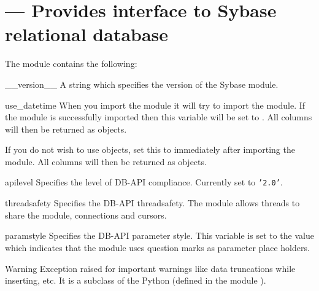 \section{ --- Provides interface to Sybase relational database}



The  module contains the following:

\begin{datadesc}{__version__}
A string which specifies the version of the Sybase module.
\end{datadesc}

\begin{datadesc}{use_datetime}
When you import the  module it will try to import the
 module.  If the  module is
successfully imported then this variable will be set to .  All
 columns will then be returned as
 objects.

If you do not wish to use  objects, set
this to  immediately after importing the 
module.  All  columns will then be returned as
 objects.
\end{datadesc}

\begin{datadesc}{apilevel}
Specifies the level of DB-API compliance.  Currently set to
\texttt{'2.0'}.
\end{datadesc}

\begin{datadesc}{threadsafety}
Specifies the DB-API threadsafety.  The  module allows
threads to share the module, connections and cursors.
\end{datadesc}

\begin{datadesc}{paramstyle}
Specifies the DB-API parameter style.  This variable is set to the
value  which indicates that the  module
uses question marks as parameter place holders.
\end{datadesc}

\begin{excdesc}{Warning}
Exception raised for important warnings like data truncations while
inserting, etc.  It is a subclass of the Python 
(defined in the module ).
\end{excdesc}

